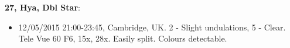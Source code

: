 {\bf 27, Hya, Dbl Star}:
\begin{itemize}
\item 12/05/2015 21:00-23:45, Cambridge, UK. 2 - Slight undulations, 5 - Clear. Tele Vue 60 F6, 15x, 28x. Easily split. Colours detectable.
\end{itemize}
